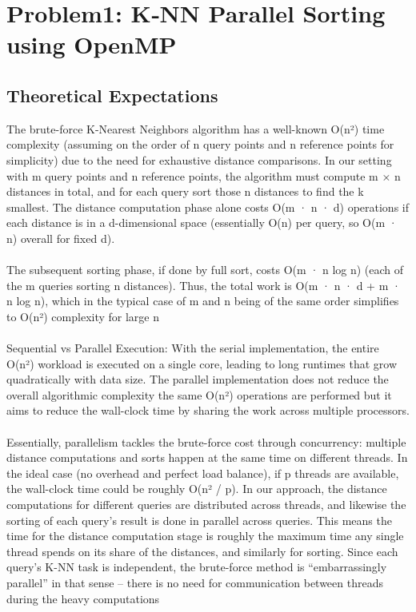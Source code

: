 \section{Problem1: K‑NN Parallel Sorting using OpenMP}
\subsection{Theoretical Expectations}
The brute-force K-Nearest Neighbors algorithm has a well-known O(n²) time complexity (assuming on the order of n query points and n reference points for simplicity) due to the need for exhaustive distance comparisons. In our setting with m query points and n reference points, the algorithm must compute m × n distances in total, and for each query sort those n distances to find the k smallest. The distance computation phase alone costs O(m · n · d) operations if each distance is in a d-dimensional space (essentially O(n) per query, so O(m · n) overall for fixed d). \parencite{article}
\\\\
The subsequent sorting phase, if done by full sort, costs O(m · n log n) (each of the m queries sorting n distances). Thus, the total work is O(m · n · d + m · n log n), which in the typical case of m and n being of the same order simplifies to O(n²) complexity for large n \parencite{article}
\\\\
Sequential vs Parallel Execution: With the serial implementation, the entire O(n²) workload is executed on a single core, leading to long runtimes that grow quadratically with data size. The parallel implementation does not reduce the overall algorithmic complexity the same O(n²) operations are performed but it aims to reduce the wall-clock time by sharing the work across multiple processors.
\\\\
Essentially, parallelism tackles the brute-force cost through concurrency: multiple distance computations and sorts happen at the same time on different threads. In the ideal case (no overhead and perfect load balance), if p threads are available, the wall-clock time could be roughly O(n² / p). In our approach, the distance computations for different queries are distributed across threads, and likewise the sorting of each query's result is done in parallel across queries. This means the time for the distance computation stage is roughly the maximum time any single thread spends on its share of the distances, and similarly for sorting. Since each query’s K-NN task is independent, the brute-force method is “embarrassingly parallel” in that sense – there is no need for communication between threads during the heavy computations
